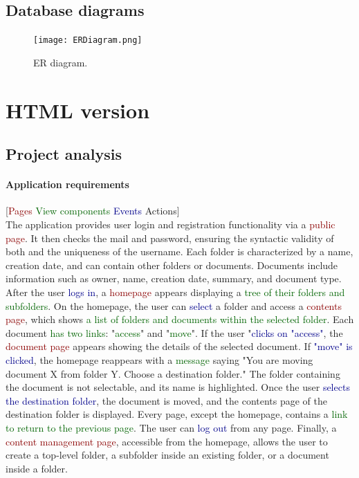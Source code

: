 \documentclass[a4paper,12pt]{article}
\begin{document}
\newpage
\subsection{Database diagrams}
\begin{figure}[h]
    \centering
    \texttt{[image: ERDiagram.png]}
    \caption{ER diagram.}
    \label{fig:ERDiagram}
\end{figure}
\newpage

\section{HTML version}
\subsection{Project analysis}

\paragraph{Application requirements}
[\textcolor{darkred}{Pages} \textcolor{darkgreen}{View components} \textcolor{darkblue}{Events} \textcolor{darkyellow}{Actions}]\\
The application provides user \textcolor{darkyellow}{login} and \textcolor{darkyellow}{registration} functionality via a \textcolor{darkred}{public page}. It then \textcolor{darkyellow}{checks the mail and password}, ensuring the syntactic validity of both and the \textcolor{darkyellow}{uniqueness of the username}. Each folder is characterized by a name, creation date, and can contain other folders or documents. Documents include information such as owner, name, creation date, summary, and document type. After the user \textcolor{darkblue}{logs in}, a \textcolor{darkred}{homepage} appears displaying a \textcolor{darkgreen}{tree of their folders and subfolders}.
On the homepage, the user can \textcolor{darkblue}{select} a folder and \textcolor{darkyellow}{access} a \textcolor{darkred}{contents page}, which shows \textcolor{darkgreen}{a list of folders and documents within the selected folder}. Each document \textcolor{darkgreen}{has two links}: "\textcolor{darkgreen}{access}" and "\textcolor{darkgreen}{move}". If the user "\textcolor{darkblue}{clicks on "access"}, the \textcolor{darkred}{document page} appears showing the details of the selected document. If \textcolor{darkblue}{"move" is clicked}, the homepage reappears with a \textcolor{darkgreen}{message} saying "You are moving document X from folder Y. Choose a destination folder." The folder containing the document is not selectable, and its name is highlighted. Once the user \textcolor{darkblue}{selects the destination folder}, \textcolor{darkyellow}{the document is moved}, and the contents page of the destination folder is displayed. Every page, except the homepage, contains a \textcolor{darkgreen}{link to return to the previous page}. The user can \textcolor{darkblue}{log out} from any page. Finally, a \textcolor{darkred}{content management page}, accessible from the homepage, allows the user to \textcolor{darkyellow}{create a top-level folder, a subfolder inside an existing folder, or a document inside a folder}.
\newpage
\end{document}
